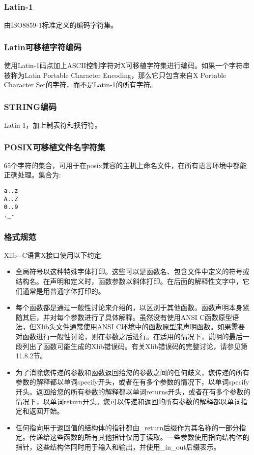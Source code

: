 \subsubsection{Latin-1}

由ISO8859-1标准定义的编码字符集。

\subsubsection{Latin可移植字符编码}

使用Latin-1码点加上ASCII控制字符对X可移植字符集进行编码。如果一个字符串被称为Latin Portable Character Encoding，那么它只包含来自X Portable Character Set的字符，而不是Latin-1的所有字符。

\subsubsection{STRING编码}

Latin-1，加上制表符和换行符。

\subsubsection{POSIX可移植文件名字符集}

65个字符的集合，可用于在posix兼容的主机上命名文件，在所有语言环境中都能正确处理。集合为:


\begin{lstlisting}
a..z
A..Z
0..9
._-
\end{lstlisting}

\subsubsection{格式规范}

\noindent Xlib−C语言X接口使用以下约定:

\begin{itemize}

\item 全局符号以这种特殊字体打印。这些可以是函数名、包含文件中定义的符号或结构名。在声明和定义时，函数参数以斜体打印。在后面的解释性文字中，它们通常是用普通字体打印的。
\item 每个函数都是通过一般性讨论来介绍的，以区别于其他函数。函数声明本身紧随其后，并对每个参数进行了具体解释。虽然没有使用ANSI C函数原型语法，但Xlib头文件通常使用ANSI C环境中的函数原型来声明函数。如果需要对函数进行一般性讨论，则在参数之后进行。在适用的情况下，说明的最后一段列出了函数可能生成的Xlib错误码。有关Xlib错误码的完整讨论，请参见第11.8.2节。
\item 为了消除您传递的参数和函数返回给您的参数之间的任何歧义，您传递的所有参数的解释都以单词specify开头，或者在有多个参数的情况下，以单词specify开头。返回给您的所有参数的解释都以单词returns开头，或者在有多个参数的情况下，以单词return开头。您可以传递和返回的所有参数的解释都以单词指定和返回开始。
\item 任何指向用于返回值的结构体的指针都由\_return后缀作为其名称的一部分指定。传递给这些函数的所有其他指针仅用于读取。一些参数使用指向结构体的指针，这些结构体同时用于输入和输出，并使用\_in\_out后缀表示。
\end{itemize}

